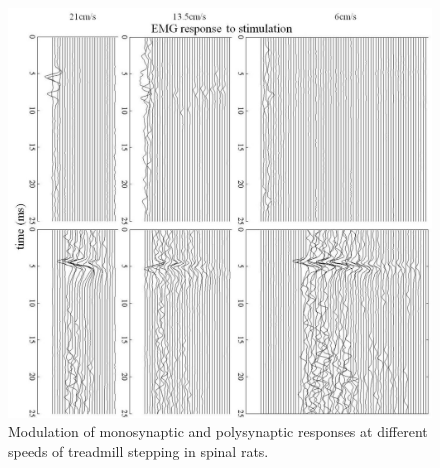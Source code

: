 \documentclass[]{elsarticle}
\begin{document}
\begin{figure}[ht!]
	\centering
	\includegraphics[width=1\textwidth]{new_pic/pic2.png}
	\caption{
    Modulation of monosynaptic and polysynaptic responses at different speeds of treadmill stepping in spinal rats.
    }
    \label{fig:lavrov_updates2}
\end{figure}
\end{document}
